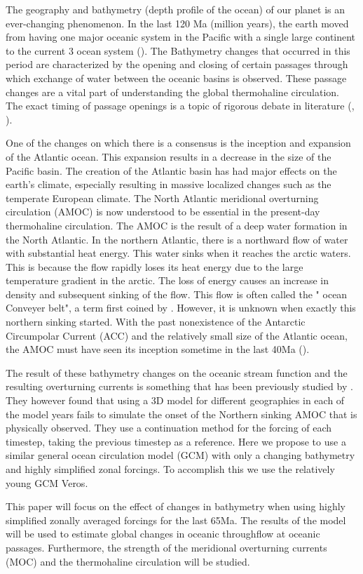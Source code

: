 The geography and bathymetry (depth profile of the ocean) of our planet is an ever-changing phenomenon. In the last 120 Ma (million years), the earth moved from having one major oceanic system in the Pacific with a single large continent to the current 3 ocean system (\cite{besse2002apparent}). The Bathymetry changes that occurred in this period are characterized by the opening and closing of certain passages through which exchange of water between the oceanic basins is observed. These passage changes are a vital part of understanding the global thermohaline circulation.  The exact timing of passage openings is a topic of rigorous debate in literature (\cite{Scher2006Apr}, \cite{Schmidt2007Jan}).

One of the changes on which there is a consensus is the inception and expansion of the Atlantic ocean. This expansion results in a decrease in the size of the Pacific basin. The creation of the Atlantic basin has had major effects on the earth's climate, especially resulting in massive localized changes such as the temperate European climate. The North Atlantic meridional overturning circulation (AMOC) is now understood to be essential in the present-day thermohaline circulation. The AMOC is the result of a deep water formation in the North Atlantic. In the northern Atlantic, there is a northward flow of water with substantial heat energy. This water sinks when it reaches the arctic waters. This is because the flow rapidly loses its heat energy due to the large temperature gradient in the arctic. The loss of energy causes an increase in density and subsequent sinking of the flow. This flow is often called the " ocean Conveyer belt", a term first coined by \cite{broecker1991great}. However, it is unknown when exactly this northern sinking started. With the past nonexistence of the Antarctic Circumpolar Current (ACC) and the relatively small size of the Atlantic ocean, the AMOC must have seen its inception sometime in the last 40Ma (\cite{Abelson2017onset}). 

The result of these bathymetry changes on the oceanic stream function and the resulting overturning currents is something that has been previously studied by \cite{Mulder2017Jul}. They however found that using a 3D model for different geographies in each of the model years fails to simulate the onset of the Northern sinking AMOC that is physically observed. They use a continuation method for the forcing of each timestep, taking the previous timestep as a reference. Here we propose to use a similar general ocean circulation model (GCM) with only a changing bathymetry and highly simplified zonal forcings. To accomplish this we use the relatively young GCM Veros.

This paper will focus on the effect of changes in bathymetry when using highly simplified zonally averaged forcings for the last 65Ma. The results of the model will be used to estimate global changes in oceanic throughflow at oceanic passages. Furthermore, the strength of the meridional overturning currents (MOC) and the thermohaline circulation will be studied.

